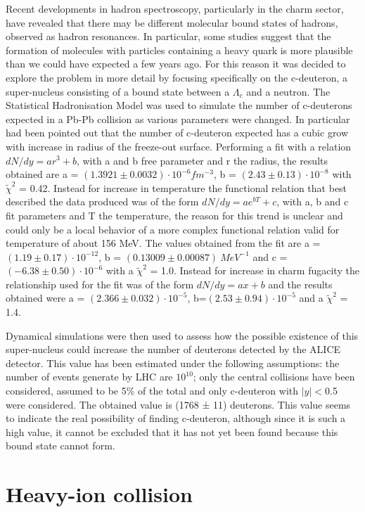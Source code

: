 \documentclass[12pt,a4paper]{book}
\begin{document}
	Recent developments in hadron spectroscopy, particularly in the charm sector, have revealed that there may be different molecular bound states of hadrons, observed as hadron resonances. In particular, some studies suggest that the formation of molecules with particles containing a heavy quark is more plausible than we could have expected a few years ago. 
	For this reason it was decided to explore the problem in more detail by focusing specifically on the c-deuteron, a super-nucleus consisting of a bound state between a $\Lambda_c$ and a neutron. The Statistical Hadronisation Model was used to simulate the number of c-deuterons expected in a Pb-Pb collision as various parameters were changed. In particular had been pointed out that the number of c-deuteron expected has a cubic grow with increase in radius of the freeze-out surface. Performing a fit with a relation $dN/dy= ar^3+b$, with a and b free parameter and r the radius, the results obtained are a = $(1.3921 \pm 0.0032) \cdot 10^{-6} fm^{-3}$, b = $(2.43 \pm 0.13)\cdot 10^{-8}$ with $\tilde{\chi}^2$ = 0.42. Instead for increase in temperature the functional relation that best described the data produced was of the form $dN/dy= ae^{bT} + c$, with a, b and c  fit parameters and T the temperature, the reason for this trend is unclear and could only be a local behavior of a more complex functional relation valid for temperature of about 156 MeV. The values obtained from the fit are a = $(1.19 \pm 0.17) \cdot 10^{-12}$, b = $(0.13009 \pm 0.00087)\ MeV^{-1}$ and c = $(-6.38 \pm 0.50)\cdot 10^{-6}$ with a $\tilde{\chi}^2$  = 1.0. Instead for increase in charm fugacity the relationship used for the fit was of the form $dN/dy=ax+b$ and the results obtained were a = $(2.366 \pm 0.032)\cdot 10^{-5}$, b=$(2.53\pm0.94)\cdot 10^{-5}$ and a $\tilde{\chi}^2$ = 1.4.
	
	Dynamical simulations were then used to assess how the possible existence of this super-nucleus could increase the number of deuterons detected by the ALICE detector. This value has been estimated under the following assumptions: the number of events generate by LHC are $10^{10}$; only the central collisions have been considered, assumed to be 5\% of the total and only c-deuteron with $|y|<$0.5 were considered. The obtained value is (1768 ± 11) deuterons. This value seems to indicate the real possibility of finding c-deuteron, although since it is such a high value, it cannot be excluded that it has not yet been found because this bound state cannot form.
	
	\chapter{Heavy-ion collision}
\end{document}
